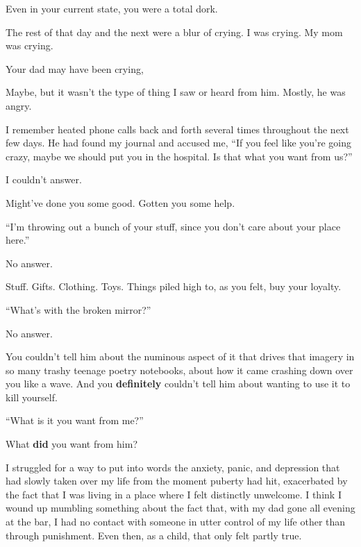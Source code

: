 \begin{paracol}{2}
\begin{leftcolumn}
\begin{ally}
Even in your current state, you were a total dork.
\end{ally}
The rest of that day and the next were a blur of crying. I was crying. My mom was crying.

\begin{ally}
Your dad may have been crying,
\end{ally}
Maybe, but it wasn't the type of thing I saw or heard from him. Mostly, he was angry.

I remember heated phone calls back and forth several times throughout the next few days. He had found my journal and accused me, ``If you feel like you're going crazy, maybe we should put you in the hospital. Is that what you want from us?''

I couldn't answer.

\begin{ally}
Might've done you some good. Gotten you some help.
\end{ally}
``I'm throwing out a bunch of your stuff, since you don't care about your place here.''

No answer.

\begin{ally}
Stuff. Gifts. Clothing. Toys. Things piled high to, as you felt, buy your loyalty.
\end{ally}
``What's with the broken mirror?''

No answer.

\begin{ally}
You couldn't tell him about the numinous aspect of it that drives that imagery in so many trashy teenage poetry notebooks, about how it came crashing down over you like a wave. And you \textbf{definitely} couldn't tell him about wanting to use it to kill yourself.
\end{ally}
``What is it you want from me?''

\begin{ally}
What \textbf{did} you want from him?
\end{ally}
I struggled for a way to put into words the anxiety, panic, and depression that had slowly taken over my life from the moment puberty had hit, exacerbated by the fact that I was living in a place where I felt distinctly unwelcome. I think I wound up mumbling something about the fact that, with my dad gone all evening at the bar, I had no contact with someone in utter control of my life other than through punishment. Even then, as a child, that only felt partly true.


\end{leftcolumn}
\end{paracol}
